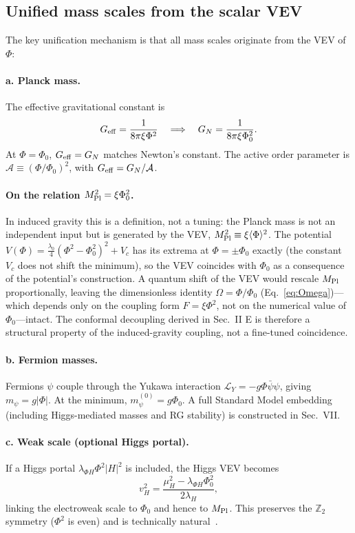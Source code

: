 \documentclass[pdflatex,sn-mathphys-num]{sn-jnl}
\newcommand{\MP}{M_{\rm Pl}}
\newcommand{\Ztwo}{\mathbb{Z}_2}
\newcommand{\PhiV}{\Phi_0}
\newcommand{\vev}[1]{\langle #1\rangle}
\theoremstyle{thmstyleone}
\begin{document}
\subsection{Unified mass scales from the scalar VEV}

The key unification mechanism is that all mass scales originate from the VEV of $\Phi$:

\paragraph{a. Planck mass.} The effective gravitational constant is
\begin{equation}
G_{\rm eff}=\frac{1}{8\pi\xi\Phi^2}
\quad\Longrightarrow\quad
G_N=\frac{1}{8\pi\xi\PhiV^2}.
\label{eq:Geff}
\end{equation}
At $\Phi=\PhiV$, $G_{\rm eff}=G_N$ matches Newton's constant. The active order parameter is $\mathcal{A}\equiv(\Phi/\PhiV)^2$, with $G_{\rm eff}=G_N/\mathcal{A}$.

\paragraph{On the relation $M_{\rm Pl}^2=\xi\PhiV^2$.} In induced gravity this is a definition, not a tuning: the Planck mass is not an independent input but is generated by the VEV, $M_{\rm Pl}^2\equiv\xi\vev{\Phi}^2$. The potential $V(\Phi)=\frac{\lambda_0}{4}(\Phi^2-\PhiV^2)^2+V_c$ has its extrema at $\Phi=\pm\PhiV$ exactly (the constant $V_c$ does not shift the minimum), so the VEV coincides with $\PhiV$ as a consequence of the potential's construction. A quantum shift of the VEV would rescale $\MP$ proportionally, leaving the dimensionless identity $\Omega=\Phi/\PhiV$ (Eq.~\eqref{eq:Omega})---which depends only on the coupling form $F=\xi\Phi^2$, not on the numerical value of $\PhiV$---intact. The conformal decoupling derived in Sec.~II E is therefore a structural property of the induced-gravity coupling, not a fine-tuned coincidence.

\paragraph{b. Fermion masses.} Fermions $\psi$ couple through the Yukawa interaction $\mathcal{L}_Y=-g\Phi\bar\psi\psi$, giving $m_\psi=g|\Phi|$. At the minimum, $m_\psi^{(0)}=g\PhiV$. A full Standard Model embedding (including Higgs-mediated masses and RG stability) is constructed in Sec.~VII.

\paragraph{c. Weak scale (optional Higgs portal).} If a Higgs portal $\lambda_{\Phi H}\Phi^2|H|^2$ is included, the Higgs VEV becomes
\begin{equation}
v_H^2=\frac{\mu_H^2-\lambda_{\Phi H}\PhiV^2}{2\lambda_H},
\label{eq:vH}
\end{equation}
linking the electroweak scale to $\PhiV$ and hence to $\MP$. This preserves the $\Ztwo$ symmetry ($\Phi^2$ is even) and is technically natural~\cite{tHooft1980}.
\end{document}
